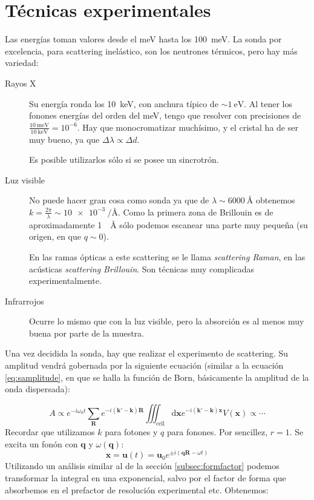 \section{Técnicas experimentales}
Las energías toman valores desde el \si{\milli\eV} hasta los \SI{100}{\milli\eV}. La sonda
por excelencia, para scattering inelástico, son los neutrones
térmicos, pero hay más variedad:
\begin{description}
\item[Rayos X] Su energía ronda los \SI{10}{\kilo\eV}, con anchura
  típico de $\sim \SI{1}{\eV}$. Al tener los fonones energías del
  orden del \si{\milli\eV}, tengo que resolver con precisiones de
  $\displaystyle \frac{\SI{10}{\milli\eV}}{\SI{10}{\kilo\eV}} =
  10^{-6}$. Hay que monocromatizar muchísimo, y el cristal ha de ser
  muy bueno, ya que $\Delta \lambda \propto \Delta d$.

  Es posible utilizarlos sólo si se posee un sincrotrón.
\item[Luz visible] No puede hacer gran cosa como sonda ya que de
  $\lambda \sim \SI{6000}{\angstrom}$ obtenemos $k =
  \frac{2\pi}{\lambda} \sim \SI{10e-3}{\per\angstrom}$. Como la primera
  zona de Brillouin es de aproximadamente \SI{1}{\per\angstrom} sólo
  podemos escanear una parte muy pequeña (su origen, en que $q \sim 0$).

  En las ramas ópticas a este scattering se le llama \emph{scattering
    Raman}, en las acústicas \emph{scattering Brillouin}. Son técnicas
  muy complicadas experimentalmente.
\item[Infrarrojos] Ocurre lo mismo que con la luz visible, pero la
  absorción es al menos muy buena por parte de la muestra.
\end{description}

Una vez decidida la sonda, hay que realizar el experimento de
scattering. Su amplitud vendrá gobernada por la siguiente ecuación (similar a la
ecuación \ref{eq:samplitude}, en que se halla la función de Born,
básicamente la amplitud de la onda dispersada):

\begin{equation}
  A \propto e^{-i\omega_0 t} \sum_{\mathbf{R}}^{ }
  e^{-i(\mathbf{k'}-\mathbf{k})\mathbf{R}} \iiint_\text{cell}
  \text{d}\mathbf{x} e^{-i(\mathbf{k'} -\mathbf{k})\mathbf{x}} V(\mathbf{x})\propto \cdots
\end{equation}
Recordar que utilizamos $k$ para fotones y $q$ para fonones. Por
sencillez, $r=1$. Se excita un fonón con $\mathbf{q}$ y
$\omega(\mathbf{q})$:
\begin{equation}
  \mathbf{x} = \mathbf{u}(t) = \mathbf{u}_0 e^{\pm i
    (\mathbf{q}\mathbf{R} - \omega t)}
\end{equation}
Utilizando un análisis similar al de la sección
\ref{subsec:formfactor} podemos transformar la integral en una
exponencial, salvo por el factor de forma que absorbemos en el
prefactor de resolución experimental etc. Obtenemos:

